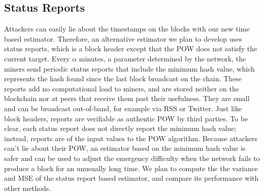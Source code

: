 \subsection{Status Reports}
Attackers can easily lie about the timestamps on the blocks with our new time based estimator. Therefore, an alternative estimator we plan to develop uses status reports, which is a block header except that the POW does not satisfy the current target. Every $\alpha$ minutes, a parameter determined by the network, the miners send periodic status reports that include the minimum hash value, which represents the hash found since the last block broadcast on the chain. These reports add no computational load to miners, and are stored neither on the blockchain nor at peers that receive them past their usefulness. They are small and can be broadcast out-of-band, for example via RSS or Twitter. Just like block headers, reports are verifiable as authentic POW by third parties. To be clear, each status report does not directly report the minimum hash value; instead, reports are of the input values to the POW algorithm. Because attackers can't lie about their POW, an estimator based on the minimum hash value is safer and can be used to adjust the emergency difficulty when the network fails to produce a block for an unusually long time. We plan to compute the the variance and MSE of the status report based estimator, and compare its performance with other methods.

